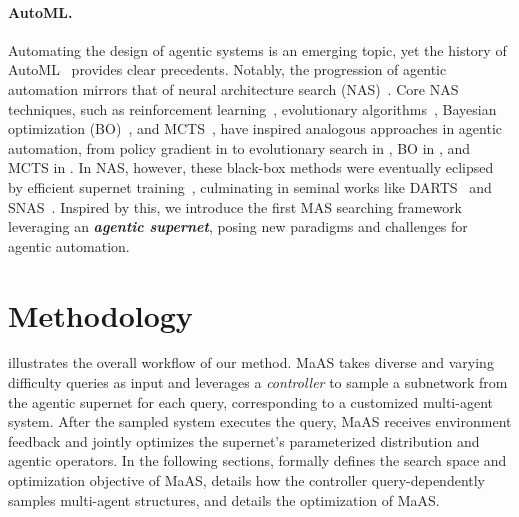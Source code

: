 \documentclass{article}
\theoremstyle{plain}
\theoremstyle{definition}
\theoremstyle{remark}
\newcommand{\ourmethod}{{{MaAS}}\xspace}
\begin{document}
\paragraph{AutoML.} Automating the design of agentic systems is an emerging topic, yet the history of AutoML~\citep{he2021automl} provides clear precedents. Notably, the progression of agentic automation mirrors that of neural architecture search (NAS)~\citep{ren2021comprehensivenas}. Core NAS techniques, such as reinforcement learning~\citep{zoph2016rl-nas}, evolutionary algorithms~\citep{liu2021evo-nas}, Bayesian optimization (BO)~\citep{white2021bananas}, and MCTS~\citep{wang2021mcts-nas}, have inspired analogous approaches in agentic automation, from policy gradient in \citep{zhuge2024gptswarm} to evolutionary search in \citep{yuan2024evoagent}, BO in \citep{shang2024agentsquare}, and MCTS in \citep{zhang2024aflow}. In NAS, however, these black-box methods were eventually eclipsed by efficient supernet training~\citep{white2023nas1k}, culminating in seminal works like DARTS~\citep{liu2018darts} and SNAS~\citep{xie2018snas}. Inspired by this, we introduce the first MAS searching framework leveraging an \textit{\textbf{agentic supernet}}, posing new paradigms and challenges for agentic automation.


          


\vspace{-0.4em}
\section{Methodology}
\vspace{-0.4em}
 illustrates the overall workflow of our method. \ourmethod takes diverse and varying difficulty queries as input and leverages a \textit{controller} to sample a subnetwork from the agentic supernet for each query, corresponding to a customized multi-agent system. After the sampled system executes the query, \ourmethod receives environment feedback and jointly optimizes the supernet’s parameterized distribution and agentic operators. In the following sections,  formally defines the search space and optimization objective of \ourmethod,  details how the controller query-dependently samples multi-agent structures, and  details the optimization of \ourmethod.
\end{document}
